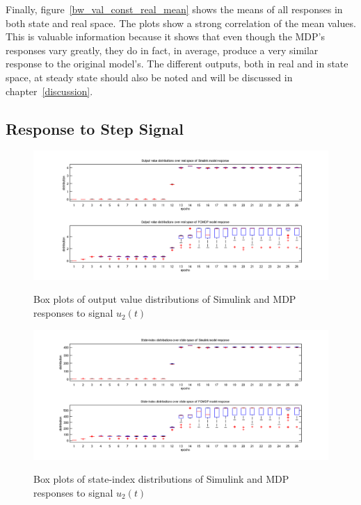 Finally, figure~\ref{bw_val_const_real_mean} shows the means of all responses in both state and real space. The plots show a strong correlation of the mean values. This is valuable information because it shows that even though the MDP's responses vary greatly, they do in fact, in average, produce a very similar response to the original model's. The different outputs, both in real and in state space, at steady state should also be noted and will be discussed in chapter~\ref{discussion}.

\subsection{Response to Step Signal}
\label{sec:respstep}

\begin{figure}[h!]
\begin{center}
\includegraphics[width=18cm]{media/bw/bw_val_step_real_box}\\
\end{center}
\caption{Box plots of output value distributions of Simulink and MDP responses to signal $u_2(t)$}
\label{bw_val_step_real_box}
\end{figure}

\begin{figure}[h!]
\begin{center}
\includegraphics[width=18cm]{media/bw/bw_val_step_state_box}\\
\end{center}
\caption{Box plots of state-index distributions of Simulink and MDP responses to signal $u_2(t)$}
\label{bw_val_step_state_box}
\end{figure}

